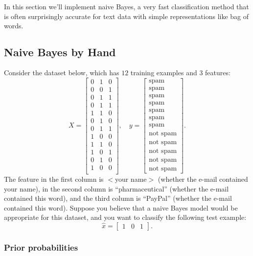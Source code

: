 \documentclass{article}
\begin{document}
In this section we'll implement naive Bayes, a very fast classification method that is often surprisingly accurate for text data with simple representations like bag of words.


\subsection{Naive Bayes by Hand}

Consider the dataset below, which has $12$ training examples and $3$ features:
\[
X = \begin{bmatrix}0 & 1 & 0\\0 & 0 & 1\\0 & 1 & 1\\ 0 & 1 & 1\\ 1 & 1 & 0\\0 & 1 & 0\\0 & 1 & 1\\1 & 0 & 0\\1 & 1 & 0\\1 & 0 & 1\\0 & 1 & 0\\1 & 0 & 0\\\end{bmatrix}, \quad y = \begin{bmatrix}\text{spam}\\\text{spam}\\\text{spam}\\\text{spam}\\\text{spam}\\\text{spam}\\\text{spam}\\\text{not spam}\\\text{not spam}\\\text{not spam}\\\text{not spam}\\\text{not spam}\end{bmatrix}.
\]
The feature in the first column is $<$your name$>$ (whether the e-mail contained your name), in the second column is ``pharmaceutical'' (whether the e-mail contained this word), and the third column is ``PayPal'' (whether the e-mail contained this word).
Suppose you believe that a naive Bayes model would be appropriate for this dataset, and you want to classify the following test example:
\[
\hat{x} = \begin{bmatrix}1 & 0 & 1\end{bmatrix}.
\]

\subsubsection{Prior probabilities}
\end{document}
